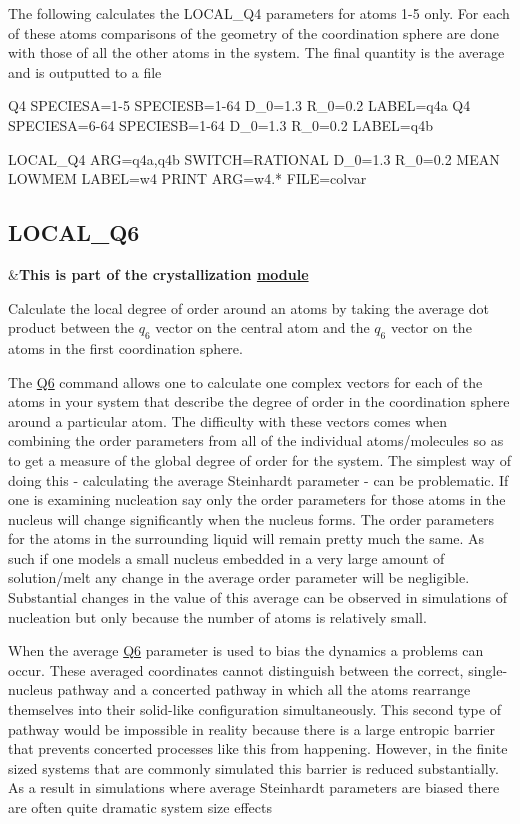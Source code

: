 The following calculates the L\+O\+C\+A\+L\+\_\+\+Q4 parameters for atoms 1-\/5 only. For each of these atoms comparisons of the geometry of the coordination sphere are done with those of all the other atoms in the system. The final quantity is the average and is outputted to a file

\begin{DoxyVerb}Q4 SPECIESA=1-5 SPECIESB=1-64 D_0=1.3 R_0=0.2 LABEL=q4a
Q4 SPECIESA=6-64 SPECIESB=1-64 D_0=1.3 R_0=0.2 LABEL=q4b

LOCAL_Q4 ARG=q4a,q4b SWITCH={RATIONAL D_0=1.3 R_0=0.2} MEAN LOWMEM LABEL=w4
PRINT ARG=w4.* FILE=colvar
\end{DoxyVerb}
 \hypertarget{LOCAL_Q6}{}\subsection{L\+O\+C\+A\+L\+\_\+\+Q6}\label{LOCAL_Q6}
\begin{TabularC}{2}
\hline
&{\bfseries  This is part of the crystallization \hyperlink{mymodules}{module }}   \\
\end{TabularC}
Calculate the local degree of order around an atoms by taking the average dot product between the $q_6$ vector on the central atom and the $q_6$ vector on the atoms in the first coordination sphere.

The \hyperlink{Q6}{Q6} command allows one to calculate one complex vectors for each of the atoms in your system that describe the degree of order in the coordination sphere around a particular atom. The difficulty with these vectors comes when combining the order parameters from all of the individual atoms/molecules so as to get a measure of the global degree of order for the system. The simplest way of doing this -\/ calculating the average Steinhardt parameter -\/ can be problematic. If one is examining nucleation say only the order parameters for those atoms in the nucleus will change significantly when the nucleus forms. The order parameters for the atoms in the surrounding liquid will remain pretty much the same. As such if one models a small nucleus embedded in a very large amount of solution/melt any change in the average order parameter will be negligible. Substantial changes in the value of this average can be observed in simulations of nucleation but only because the number of atoms is relatively small.

When the average \hyperlink{Q6}{Q6} parameter is used to bias the dynamics a problems can occur. These averaged coordinates cannot distinguish between the correct, single-\/nucleus pathway and a concerted pathway in which all the atoms rearrange themselves into their solid-\/like configuration simultaneously. This second type of pathway would be impossible in reality because there is a large entropic barrier that prevents concerted processes like this from happening. However, in the finite sized systems that are commonly simulated this barrier is reduced substantially. As a result in simulations where average Steinhardt parameters are biased there are often quite dramatic system size effects

